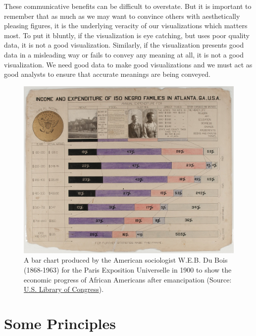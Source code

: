 \documentclass[
  letterpaper,
]{book}
\begin{document}
These communicative benefits can be difficult to overstate. But it is
important to remember that as much as we may want to convince others
with aesthetically pleasing figures, it is the underlying veracity of
our visualizations which matters most. To put it bluntly, if the
visualization is eye catching, but uses poor quality data, it is not a
good visualization. Similarly, if the visualization presents good data
in a misleading way or fails to convey any meaning at all, it is not a
good visualization. We need good data to make good visualizations and we
must act as good analysts to ensure that accurate meanings are being
conveyed.

\begin{figure}

{\centering \includegraphics{images/Dubois bar chart.jpg}

}

\caption{A bar chart produced by the American sociologist W.E.B. Du Bois
(1868-1963) for the Paris Exposition Universelle in 1900 to show the
economic progress of African Americans after emancipation (Source:
\href{https://www.loc.gov/pictures/item/2013650354/}{U.S. Library of
Congress}).}

\end{figure}

\hypertarget{some-principles}{%
\section{Some Principles}\label{some-principles}}
\end{document}
